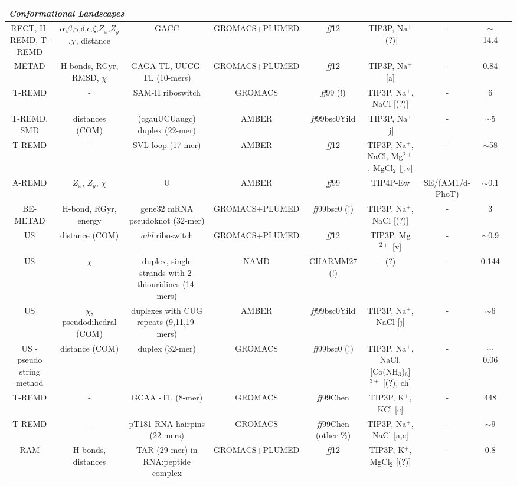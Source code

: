 \begin{tabular}{ccccccccc}
\midrule 
\multicolumn{9}{l}{\emph{Conformational Landscapes}}\tabularnewline
\midrule 
RECT, H-REMD, T-REMD & $\alpha$,$\beta$,$\gamma$,$\delta$,$\epsilon$,$\zeta$,$Z_{x}$,$Z_{y}$,$\chi$, distance & GACC & GROMACS+PLUMED & \emph{ff}12 & TIP3P, Na$^{+}$ {[}(?){]} & - & $\sim$14.4 & \cite{gil2015}\tabularnewline
\midrule 
METAD & H-bonds, RGyr, RMSD, $\chi$ & GAGA-TL, UUCG-TL (10-mers) & GROMACS+PLUMED & \emph{ff}12 & TIP3P, Na$^{+}$ {[}a{]} & - & 0.84 & \cite{haldar2015insights}\tabularnewline
\midrule 
T-REMD & - & SAM-II riboswitch & GROMACS & \emph{ff}99 (!) & TIP3P, Na$^{+}$, NaCl {[}(?){]} & - & 6 & \cite{xue2015folding}\tabularnewline
\midrule 
T-REMD, SMD & distances (COM) & (cgauUCUaugc) duplex (22-mer) & AMBER & \emph{ff}99bsc0Yild & TIP3P, Na$^{+}$ {[}j{]} & - & $\sim$5 & \cite{park2015crystallographic}\tabularnewline
\midrule 
T-REMD & - & SVL loop (17-mer) & AMBER & \emph{ff}12 & TIP3P, Na$^{+}$, NaCl, Mg$^{2+}$, MgCl$_{2}$ {[}j,v{]} & - & $\sim$58 & \cite{bergonzo2015stem}\tabularnewline
\midrule 
A-REMD & $Z_{x}$, $Z_{y}$, $\chi$ & U & AMBER & \emph{ff}99 & TIP4P-Ew & SE/(AM1/d-PhoT) & $\sim$0.1 & \cite{radak2015characterization}\tabularnewline
\midrule 
BE-METAD & H-bond, RGyr, energy & gene32 mRNA pseudoknot (32-mer) & GROMACS+PLUMED & \emph{ff}99bsc0 (!) & TIP3P, Na$^{+}$, NaCl {[}(?){]} & - & 3 & \cite{bian2015free}\tabularnewline
\midrule 
US & distance (COM) & \emph{add }riboswitch & GROMACS+PLUMED & \emph{ff}12 & TIP3P, Mg$^{2+}$ {[}v{]} & - & $\sim$0.9 & \cite{di2015kissing}\tabularnewline
\midrule 
US & $\chi$ & duplex, single strands with 2-thiouridines (14-mers) & NAMD & CHARMM27 (!) & (?) & - & 0.144 & \cite{larsen2015thermodynamic}\tabularnewline
\midrule 
US & $\chi$, pseudodihedral (COM) & duplexes with CUG repeats (9,11,19-mers) & AMBER & \emph{ff}99bsc0Yild & TIP3P, Na$^{+}$, NaCl {[}j{]} & - & $\sim$6 & \cite{yildirim2015computational}\tabularnewline
\midrule
US - pseudo string method & distance (COM) & duplex (32-mer) & GROMACS & \emph{ff}99bsc0 (!) & TIP3P, Na$^{+}$, NaCl, {[}Co(NH$_{3}$)$_{6}${]}$^{3+}$ {[}(?), ch{]} & - & $\sim$0.06 & \cite{wu2015multivalent}\tabularnewline
\midrule 
T-REMD & - & GCAA -TL (8-mer) & GROMACS & \emph{ff}99Chen & TIP3P, K$^{+}$, KCl {[}c{]} & - & 448  & \cite{miner2016free}\tabularnewline
\midrule
T-REMD & - & pT181 RNA hairpins (22-mers) & GROMACS & \emph{ff}99Chen (other \%) & TIP3P, Na$^{+}$, NaCl {[}a,c{]} & - & $\sim$9 & \cite{takahashi2016using}\tabularnewline
\midrule
RAM & H-bonds, distances & TAR (29-mer) in RNA:peptide complex & GROMACS+PLUMED & \emph{ff}12 & TIP3P, K$^{+}$, MgCl$_{2}$ {[}(?){]} & - & 0.8 & \cite{borkar2016structure}\tabularnewline

\end{tabular}
